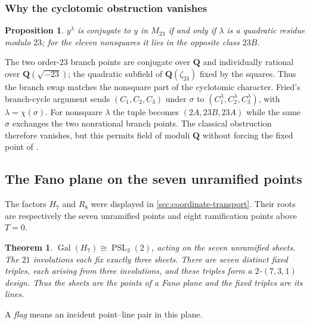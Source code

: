 \documentclass[11pt]{amsart}
\newtheorem{theorem}{Theorem}[section]
\newtheorem{proposition}[proposition]{Proposition}
\theoremstyle{definition}
\theoremstyle{remark}
\newcommand{\QQ}{\mathbf Q}
\newcommand{\Gal}{\operatorname{Gal}}
\newcommand{\PSL}{\operatorname{PSL}}
\newcommand{\Mtt}{M_{23}}
\begin{document}
\subsubsection{Why the cyclotomic obstruction vanishes}

\begin{proposition}\label{prop:qr}
$y^\lambda$ is conjugate to $y$ in $\Mtt$ if and only if $\lambda$ is a
quadratic residue modulo $23$; for the eleven nonsquares it lies in the
opposite class $23B$.
\end{proposition}

The two order-$23$ branch points are conjugate over $\QQ$ and individually
rational over $\QQ(\sqrt{-23})$; the
quadratic subfield of $\QQ(\zeta_{23})$ fixed by the squares.  Thus the
branch swap matches the nonsquare part of the cyclotomic character.  Fried's
branch-cycle argument sends $(C_1,C_2,C_3)$ under $\sigma$ to
$(C_1^\lambda,C_2^\lambda,C_3^\lambda)$, with
$\lambda=\chi(\sigma)$.  For nonsquare $\lambda$ the tuple becomes
$(2A,23B,23A)$ while the same $\sigma$ exchanges the two nonrational branch
points.  The classical obstruction therefore vanishes, but this permits
field of moduli $\QQ$ without forcing the fixed point of \cite{HJLPPZ}.

\subsection{The Fano plane on the seven unramified points}
\label{sec:fano-plane}

The factors $H_7$ and $R_8$ were displayed in
\cref{sec:coordinate-transport}.  Their
roots are respectively the seven unramified points and eight ramification
points above $T=0$.

\begin{theorem}\label{thm:fano-plane}
$\Gal(H_7)\cong\PSL_3(2)$, acting on the seven unramified sheets.  The $21$
involutions each fix exactly three sheets.  There are seven distinct fixed
triples, each arising from three involutions, and these triples form a
$2$-$(7,3,1)$ design.  Thus the sheets are the points of a Fano plane and
the fixed triples are its lines.
\end{theorem}

\smallskip
A \emph{flag} means an incident point--line pair in this plane.
\end{document}
